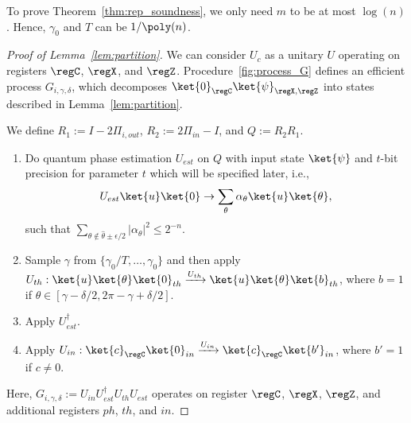 \begin{remark}
To prove Theorem~\ref{thm:rep_soundness}, we only need $m$ to be at most $\log(n)$. Hence, $\gamma_0$ and $T$ can be $1/\poly(n)$. 
\end{remark}



\begin{proof}[Proof of Lemma~\ref{lem:partition}]
We can consider $U_c$ as a unitary $U$ operating on registers $\regC$, $\regX$, and $\regZ$. Procedure~\ref{fig:process_G} defines an efficient process $G_{i,\gamma,\delta}$, which decomposes $\ket{0}_{\regC}\ket{\psi}_{\regX,\regZ}$ into states described in Lemma~\ref{lem:partition}.    

\begin{algorithm}[h]
    \begin{mdframed}[style=figstyle,innerleftmargin=10pt,innerrightmargin=10pt]
    We define $R_1:= I-2\Pi_{i,out} $, $R_2:= 2\Pi_{in}-I$, and $Q:= R_2R_1$. 
    \begin{enumerate}
    \item Do quantum phase estimation $U_{est}$ on $Q$ with input state $\ket{\psi}$ and $t$-bit precision for parameter $t$ which will be specified later, i.e.,  
    \begin{align*}
        U_{est}\ket{u}\ket{0} \rightarrow \sum_{\theta} \alpha_{\theta} \ket{u}\ket{\theta},
    \end{align*}
    such that $\sum_{\theta\notin \hat{\theta}\pm \epsilon/2}|\alpha_{\theta}|^2\leq 2^{-n}$.
    \item Sample $\gamma$ from $\{\gamma_0/T,\dots,\gamma_0\}$ and then apply $U_{th}:\ket{u}\ket{\theta}\ket{0}_{th} \xrightarrow{U_{th}} \ket{u}\ket{\theta}\ket{b}_{th} $, 
    where $b=1$ if $\theta\in [\gamma-\delta/2, 2\pi - \gamma + \delta/2]$. 
    \item Apply $U^{\dag}_{est}$. 
    \item Apply $U_{in}: \ket{c}_{\regC}\ket{0}_{in} \xrightarrow{U_{in}}  \ket{c}_{\regC}\ket{b'}_{in}$,
    where $b'=1$ if $c\neq 0$. 
\end{enumerate}
    \caption{$G_{i,\gamma,\delta}$}
    \label{fig:process_G}
    \end{mdframed}
\end{algorithm}

Here, $G_{i,\gamma,\delta} := U_{in}U^{\dag}_{est}U_{th}U_{est}$ operates on register $\regC$, $\regX$, $\regZ$, and additional registers $ph$, $th$, and $in$.


\end{proof}
